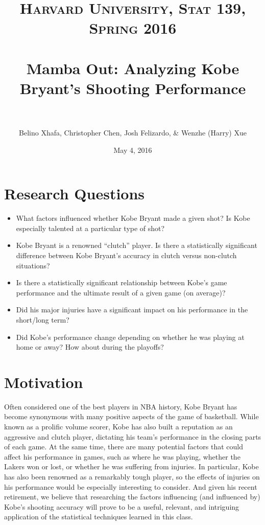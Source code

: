 \documentclass[paper=a4, fontsize=11pt]{scrartcl} %
\title{ 
\normalfont \normalsize 
\textsc{Harvard University, Stat 139, Spring 2016} \\ [25pt] %
\horrule{0.5pt} \\[0.4cm] %
\huge Mamba Out: Analyzing Kobe Bryant's Shooting Performance \\ %
\horrule{2pt} \\[0.5cm] %
}
\author{Belino Xhafa, Christopher Chen, Josh Felizardo, \& Wenzhe (Harry) Xue}
\date{\normalsize May 4, 2016} %
\numberwithin{equation}{section} %
\numberwithin{figure}{section} %
\numberwithin{table}{section} %
\begin{document}
\maketitle %

\tableofcontents
\section{Research Questions}
\begin{itemize}
	\item What factors influenced whether Kobe Bryant made a given shot? Is Kobe especially talented at a particular type of shot?
	\item Kobe Bryant is a renowned ``clutch'' player. Is there a statistically significant difference between Kobe Bryant's accuracy in clutch versus non-clutch situations?
	\item Is there a statistically significant relationship between Kobe's game performance and the ultimate result of a given game (on average)?
	\item Did his major injuries have a significant impact on his performance in the short/long term?
	\item Did Kobe's performance change depending on whether he was playing at home or away? How about during the playoffs?
\end{itemize}
\section{Motivation}
\hspace*{1cm}Often considered one of the best players in NBA history, Kobe Bryant has become synonymous with many positive aspects of the game of basketball. While known as a prolific volume scorer, Kobe has also built a reputation as an aggressive and clutch player, dictating his team's performance in the closing parts of each game. At the same time, there are many potential factors that could affect his performance in games, such as where he was playing, whether the Lakers won or lost, or whether he was suffering from injuries. In particular, Kobe has also been renowned as a remarkably tough player, so the effects of injuries on his performance would be especially interesting to consider. And given his recent retirement, we believe that researching the factors influencing (and influenced by) Kobe's shooting accuracy will prove to be a useful, relevant, and intriguing application of the statistical techniques learned in this class. 
\end{document}
